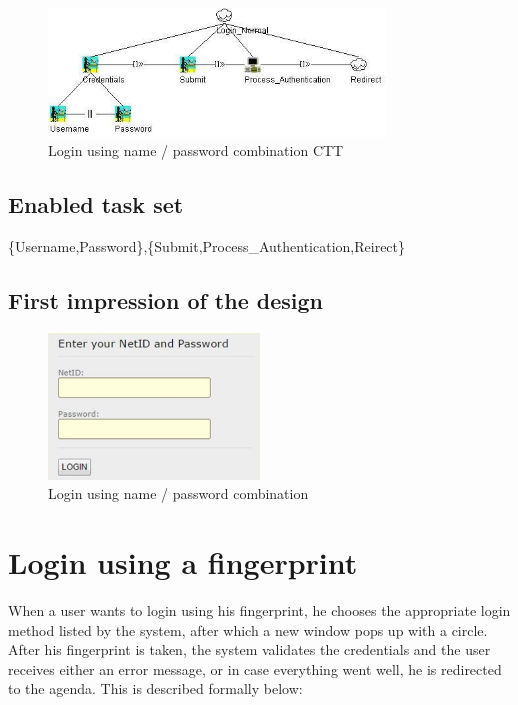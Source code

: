 \documentclass[11pt, a4paper,svglistings]{report}
\begin{document}
\begin{figure}[H]
\centering
    \includegraphics[width=0.8\textwidth]{LoginUsernamePass.png}
  \caption[Username / password CTT]{\label{fig:Logout}Login using name / password combination CTT}
\end{figure}

\subsection{Enabled task set}

\{Username,Password\},\{Submit,Process\_Authentication,Reirect\}

\subsection{First impression of the design}

\begin{figure}[H]
\centering
    \includegraphics[width=0.5\textwidth]{LoginNoKeyboard.jpg}
  \caption[Login screen]{\label{fig:Login}Login using name / password combination}
\end{figure}


\newpage

\section{\label{subsec:loginFinger}Login using a fingerprint}

When a user wants to login using his fingerprint, he chooses the appropriate login method listed by the system, after which a new window pops up with a circle. After his fingerprint is taken, the system validates the credentials and the user receives either an error message, or in case everything went well, he is redirected to the agenda. This is described formally below:
\end{document}
